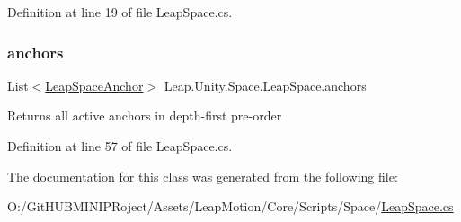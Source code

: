 Definition at line 19 of file Leap\+Space.\+cs.

\mbox{\label{class_leap_1_1_unity_1_1_space_1_1_leap_space_a2fe263fdf2f99d707d36c8797cf9f4e4}} 
\subsubsection{\texorpdfstring{anchors}{anchors}}
{\footnotesize\ttfamily List$<$\mbox{\hyperlink{class_leap_1_1_unity_1_1_space_1_1_leap_space_anchor}{Leap\+Space\+Anchor}}$>$ Leap.\+Unity.\+Space.\+Leap\+Space.\+anchors\hspace{0.3cm}{\ttfamily [get]}}



Returns all active anchors in depth-\/first pre-\/order 



Definition at line 57 of file Leap\+Space.\+cs.



The documentation for this class was generated from the following file\+:\begin{DoxyCompactItemize}
\item 
O\+:/\+Git\+H\+U\+B\+M\+I\+N\+I\+P\+Roject/\+Assets/\+Leap\+Motion/\+Core/\+Scripts/\+Space/\mbox{\hyperlink{_leap_space_8cs}{Leap\+Space.\+cs}}\end{DoxyCompactItemize}
